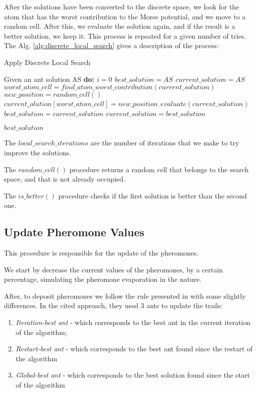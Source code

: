 			After the solutions have been converted to the discrete space, we look for the atom that has the worst contribution to the Morse potential, and we move to a random cell.  After this, we evaluate the solution again, and if the result is a better solution, we keep it. This process is repeated for a given number of tries. The Alg. \ref{alg:discrete_local_search} gives a description of the process:
	
			\begin{algorithm}
				\caption{Apply Discrete Local Search}
				\label{alg:discrete_local_search}
				\begin{algorithmic}
				\STATE Given an ant solution AS \bf{do}:
				\STATE $i = 0$
				\STATE $best\_solution = AS$
				\STATE $current\_solution = AS$
					\STATE $worst\_atom\_cell = find\_atom\_worst\_contribution(current\_solution)$
					\STATE $new\_position = random\_cell()$
					\STATE $current_solution[worst\_atom\_cell] = new\_position$
					\STATE $evaluate(current\_solution)$
						\STATE $best\_solution = current\_solution$
					\ELSE
						\STATE $current\_solution = best\_solution$
					\ENDIF
				\ENDWHILE
				
				\RETURN $best\_solution$
				\end{algorithmic}
			\end{algorithm}		
			
			The $local\_search\_iterations$ are the number of iterations that we make to try improve the solutions.

			The $random\_cell()$ procedure returns a random cell that belongs to the search space, and that is not already occupied.

			The $is\_better()$ procedure checks if the first solution is better than the second one.
			\subsection{Update Pheromone Values}
			This procedure is responsible for the update of the pheromones. 

			We start by decrease the current values of the pheromones, by a certain percentage, simulating the pheromone evaporation in the nature.

			After, to deposit pheromones we follow the rule presented in \cite{blum04} with some slightly differences. In the cited approach, they used 3 ants to update the trails:
			\begin{enumerate}
				\item \emph{Iteration-best ant} - which corresponds to the best ant in the current iteration of the algorithm;
				\item \emph{Restart-best ant} - which corresponds to the best ant found since the restart of the algorithm
				\item \emph{Global-best ant} - which corresponds to the best solution found since the start of the algorithm
			\end{enumerate}
			
